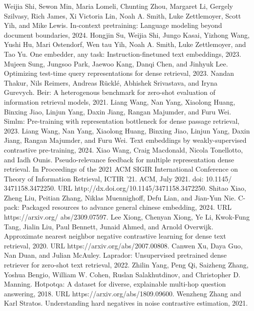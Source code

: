 Weijia Shi, Sewon Min, Maria Lomeli, Chunting Zhou, Margaret Li, Gergely Szilvasy, Rich James, Xi Victoria Lin, Noah A. Smith, Luke Zettlemoyer, Scott Yih, and Mike Lewis. In-context pretraining: Language modeling beyond document boundaries, 2024.
Hongjin Su, Weijia Shi, Jungo Kasai, Yizhong Wang, Yushi Hu, Mari Ostendorf, Wen tau Yih, Noah A. Smith, Luke Zettlemoyer, and Tao Yu. One embedder, any task: Instruction-finetuned text embeddings, 2023.
Mujeen Sung, Jungsoo Park, Jaewoo Kang, Danqi Chen, and Jinhyuk Lee. Optimizing test-time query representations for dense retrieval, 2023.
Nandan Thakur, Nils Reimers, Andreas Rücklé, Abhishek Srivastava, and Iryna Gurevych. Beir: A heterogenous benchmark for zero-shot evaluation of information retrieval models, 2021.
Liang Wang, Nan Yang, Xiaolong Huang, Binxing Jiao, Linjun Yang, Daxin Jiang, Rangan Majumder, and Furu Wei. Simlm: Pre-training with representation bottleneck for dense passage retrieval, 2023.
Liang Wang, Nan Yang, Xiaolong Huang, Binxing Jiao, Linjun Yang, Daxin Jiang, Rangan Majumder, and Furu Wei. Text embeddings by weakly-supervised contrastive pre-training, 2024.
Xiao Wang, Craig Macdonald, Nicola Tonellotto, and Iadh Ounis. Pseudo-relevance feedback for multiple representation dense retrieval. In Proceedings of the 2021 ACM SIGIR International Conference on Theory of Information Retrieval, ICTIR '21. ACM, July 2021. doi: 10.1145/ 3471158.3472250. URL http://dx.doi.org/10.1145/3471158.3472250.
Shitao Xiao, Zheng Liu, Peitian Zhang, Niklas Muennighoff, Defu Lian, and Jian-Yun Nie. C-pack: Packaged resources to advance general chinese embedding, 2024. URL https://arxiv.org/ abs/2309.07597.
Lee Xiong, Chenyan Xiong, Ye Li, Kwok-Fung Tang, Jialin Liu, Paul Bennett, Junaid Ahmed, and Arnold Overwijk. Approximate nearest neighbor negative contrastive learning for dense text retrieval, 2020. URL https://arxiv.org/abs/2007.00808.
Canwen Xu, Daya Guo, Nan Duan, and Julian McAuley. Laprador: Unsupervised pretrained dense retriever for zero-shot text retrieval, 2022.
Zhilin Yang, Peng Qi, Saizheng Zhang, Yoshua Bengio, William W. Cohen, Ruslan Salakhutdinov, and Christopher D. Manning. Hotpotqa: A dataset for diverse, explainable multi-hop question answering, 2018. URL https://arxiv.org/abs/1809.09600.
Wenzheng Zhang and Karl Stratos. Understanding hard negatives in noise contrastive estimation, 2021.

